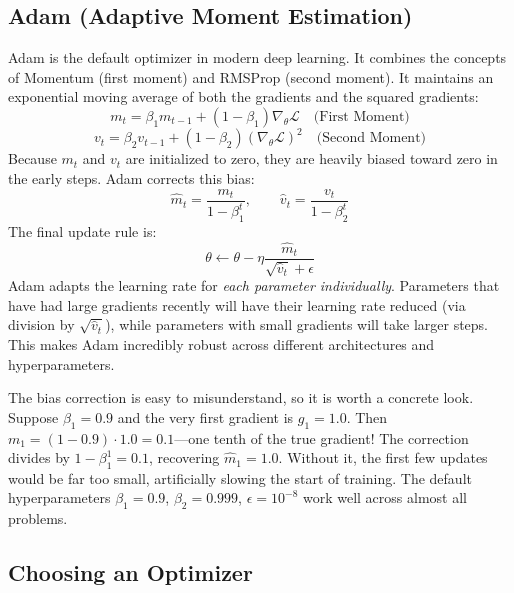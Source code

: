 \documentclass{tufte-handout}
\let\subsubsection\subsection
\begin{document}
\subsubsection{Adam (Adaptive Moment Estimation)}
Adam is the default optimizer in modern deep learning. It combines the concepts of Momentum (first moment) and RMSProp (second moment). It maintains an exponential moving average of both the gradients and the squared gradients:
\[
m_t = \beta_1 m_{t-1} + (1-\beta_1)\nabla_\theta \mathcal{L} \quad \text{(First Moment)}
\]
\[
v_t = \beta_2 v_{t-1} + (1-\beta_2)(\nabla_\theta \mathcal{L})^2 \quad \text{(Second Moment)}
\]
Because $m_t$ and $v_t$ are initialized to zero, they are heavily biased toward zero in the early steps. Adam corrects this bias:
\[
\hat{m}_t = \frac{m_t}{1 - \beta_1^t}, \qquad \hat{v}_t = \frac{v_t}{1 - \beta_2^t}
\]
The final update rule is:
\[
\theta \leftarrow \theta - \eta \frac{\hat{m}_t}{\sqrt{\hat{v}_t} + \epsilon}
\]
Adam adapts the learning rate for \textit{each parameter individually}. Parameters that have had large gradients recently will have their learning rate reduced (via division by $\sqrt{\hat{v}_t}$), while parameters with small gradients will take larger steps. This makes Adam incredibly robust across different architectures and hyperparameters.

The bias correction is easy to misunderstand, so it is worth a concrete look. Suppose $\beta_1 = 0.9$ and the very first gradient is $g_1 = 1.0$. Then $m_1 = (1-0.9) \cdot 1.0 = 0.1$---one tenth of the true gradient! The correction divides by $1 - \beta_1^1 = 0.1$, recovering $\hat{m}_1 = 1.0$. Without it, the first few updates would be far too small, artificially slowing the start of training. The default hyperparameters $\beta_1 = 0.9$, $\beta_2 = 0.999$, $\epsilon = 10^{-8}$ work well across almost all problems.

\subsubsection{Choosing an Optimizer}
\end{document}

